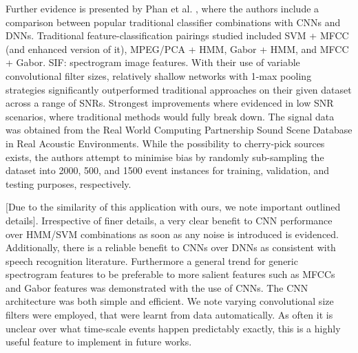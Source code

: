 \documentclass[12pt]{llncs}
\begin{document}
Further evidence is presented by Phan et al. \cite{phan2016robust}, where the authors include a comparison between popular traditional classifier combinations with CNNs and DNNs. Traditional feature-classification pairings studied included SVM + MFCC (and enhanced version of it), MPEG/PCA + HMM, Gabor + HMM, and MFCC + Gabor. SIF: spectrogram image features. With their use of variable convolutional filter sizes, relatively shallow networks with  1-max pooling strategies significantly outperformed traditional approaches on their given dataset across a range of SNRs. Strongest improvements where evidenced in low SNR scenarios, where traditional methods would fully break down. The signal data was obtained from the Real World Computing Partnership Sound Scene Database in Real Acoustic Environments. While the possibility to cherry-pick sources exists, the authors attempt to minimise bias by randomly sub-sampling the dataset into  2000, 500, and 1500 event instances for training, validation, and testing purposes, respectively. 

[Due to the similarity of this application with ours, we note important outlined details]. Irrespective of finer details, a very clear benefit to CNN performance over HMM/SVM combinations as soon as any noise is introduced is evidenced. Additionally, there is a reliable benefit to CNNs over DNNs as consistent with speech recognition literature. Furthermore a general trend for generic spectrogram features to be preferable to more salient features such as MFCCs and Gabor features was demonstrated with the use of CNNs. The CNN architecture was both simple and efficient. We note varying convolutional size filters were employed, that were learnt from data automatically. As often it is unclear over what time-scale events happen predictably exactly, this is a highly useful feature to implement in future works.

\end{document}
